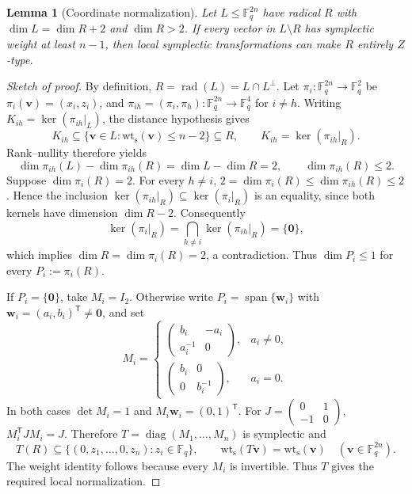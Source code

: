 \documentclass{article}
\newtheorem{lemma}{Lemma}
\newcommand{\F}{\mathbb{F}}
\newcommand{\vct}[1]{\boldsymbol{#1}} %
\newcommand{\wt}{\operatorname{wt_s}}
\begin{document}
\begin{lemma}[Coordinate normalization]\label{lem:coordinate-normalization}
Let $L\le\F_q^{2n}$ have radical $R$ with $\dim L=\dim R+2$ and
$\dim R>2$. If every vector in $L\setminus R$ has symplectic weight at
least $n-1$, then local symplectic transformations can make $R$ entirely
$Z$-type.
\end{lemma}
\begin{proof}[Sketch of proof]
By definition, $R=\operatorname{rad}(L)=L\cap L^\perp$.
Let $\pi_i:\F_q^{2n}\to\F_q^2$ be $\pi_i(\vct v)=(x_i,z_i)$,
and $\pi_{ih}=(\pi_i,\pi_h):\F_q^{2n}\to\F_q^4$ for $i\ne h$.
Writing $K_{ih}=\ker(\pi_{ih}|_L)$, the distance hypothesis gives
\[
 K_{ih}\subseteq\{\vct v\in L:\wt(\vct v)\le n-2\}\subseteq R,
 \qquad K_{ih}=\ker(\pi_{ih}|_R).
\]
Rank--nullity therefore yields
\[
 \dim\pi_{ih}(L)-\dim\pi_{ih}(R)=\dim L-\dim R=2,
 \qquad \dim\pi_{ih}(R)\le2.
\]
Suppose $\dim\pi_i(R)=2$. For every $h\ne i$,
$2=\dim\pi_i(R)\le\dim\pi_{ih}(R)\le2$. Hence the inclusion
$\ker(\pi_{ih}|_R)\subseteq\ker(\pi_i|_R)$ is an equality, since
both kernels have dimension $\dim R-2$. Consequently
\[
 \ker(\pi_i|_R)=\bigcap_{h\ne i}\ker(\pi_{ih}|_R)=\{\vct0\},
\]
which implies $\dim R=\dim\pi_i(R)=2$, a contradiction.
Thus $\dim P_i\le1$ for every $P_i:=\pi_i(R)$.

If $P_i=\{\vct0\}$, take $M_i=I_2$. Otherwise write
$P_i=\operatorname{span}\{\vct w_i\}$ with
$\vct w_i=(a_i,b_i)^{\mathsf T}\ne\vct0$, and set
\[
 M_i=
 \begin{cases}
  \begin{pmatrix}b_i&-a_i\\a_i^{-1}&0\end{pmatrix},&a_i\ne0,\\[3pt]
  \begin{pmatrix}b_i&0\\0&b_i^{-1}\end{pmatrix},&a_i=0.
 \end{cases}
\]
In both cases $\det M_i=1$ and $M_i\vct w_i=(0,1)^{\mathsf T}$.
For $J=\left(\begin{smallmatrix}0&1\\-1&0\end{smallmatrix}\right)$,
$M_i^{\mathsf T}JM_i=J$. Therefore
$T=\operatorname{diag}(M_1,\ldots,M_n)$ is symplectic and
\[
 T(R)\subseteq\{(0,z_1,\ldots,0,z_n):z_i\in\F_q\},
 \qquad \wt(T\vct v)=\wt(\vct v)\quad(\vct v\in\F_q^{2n}).
\]
The weight identity follows because every $M_i$ is invertible.
Thus $T$ gives the required local normalization.
\end{proof}
\end{document}
